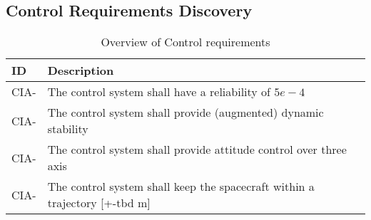 \subsection{Control Requirements Discovery} \label{sec:req-control}



\begin{table}[H]
	\caption{Overview of Control requirements}
	\begin{tabular}{|p{}|p{}|}
		\hline
		ID         & Description                                                                                                      \\ \hline \hline
		CIA- &     The control system shall have a reliability of $5e-4$            						\\ \hline
		CIA- &     The control system shall provide (augmented) dynamic stability       					\\ \hline
		CIA- &     The control system shall provide attitude control over three axis         				\\ \hline
		CIA- &     The control system shall keep the spacecraft within a trajectory [+-\gls{tbd} m]       	\\ \hline		
	\end{tabular}
	\label{tab:controlreq}
\end{table}